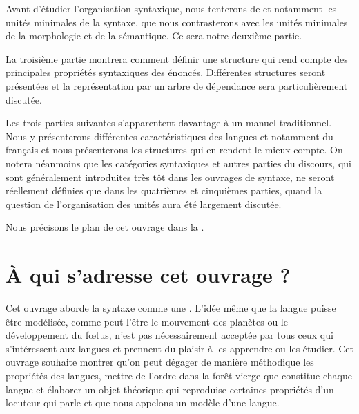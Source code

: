 Avant d’étudier l’organisation syntaxique, nous tenterons de  et notamment les unités minimales de la syntaxe, que nous contrasterons avec les unités minimales de la morphologie et de la sémantique. Ce sera notre deuxième partie.

La troisième partie montrera comment définir une structure qui rend compte des principales propriétés syntaxiques des énoncés. Différentes structures seront présentées et la représentation par un arbre de dépendance sera particulièrement discutée.

Les trois parties suivantes s’apparentent davantage à un manuel traditionnel. Nous y présenterons différentes caractéristiques des langues et notamment du français et nous présenterons les structures qui en rendent le mieux compte. On notera néanmoins que les catégories syntaxiques et autres parties du discours, qui sont généralement introduites très tôt dans les ouvrages de syntaxe, ne seront réellement définies que dans les quatrièmes et cinquièmes parties, quand la question de l’organisation des unités aura été largement discutée.

Nous précisons le plan de cet ouvrage dans la .

\section{À qui s’adresse cet ouvrage ?}\label{sec:0.0.3}

Cet ouvrage aborde la syntaxe comme une  . L’idée même que la langue puisse être modélisée, comme peut l’être le mouvement des planètes ou le développement du fœtus, n’est pas nécessairement acceptée par tous ceux qui s’intéressent aux langues et prennent du plaisir à les apprendre ou les étudier. Cet ouvrage souhaite montrer qu’on peut dégager de manière méthodique les propriétés des langues, mettre de l’ordre dans la forêt vierge que constitue chaque langue et élaborer un objet théorique qui reproduise certaines propriétés d’un locuteur qui parle et que nous appelons un modèle d’une langue.

